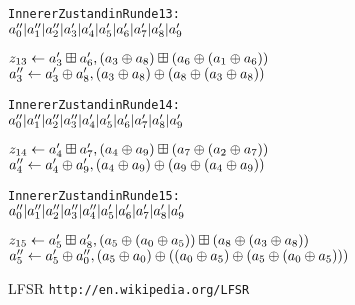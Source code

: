 \documentclass[a4paper,12pt]{article}
\begin{document}
\begin{appendix}
\begin{alltt}
Innerer Zustand in Runde 13:
\( a''\sb{0} | a''\sb{1} | a''\sb{2} | a'\sb{3} | a'\sb{4} | a'\sb{5} | a'\sb{6} | a'\sb{7} | a'\sb{8} | a'\sb{9} \)

\( z\sb{13} \leftarrow a'\sb{3} \boxplus a'\sb{6} , (a\sb{3} \oplus a\sb{8}) \boxplus (a\sb{6} \oplus (a\sb{1} \oplus a\sb{6})) \)
\( a''\sb{3} \leftarrow a'\sb{3} \oplus a'\sb{8} , (a\sb{3} \oplus a\sb{8}) \oplus (a\sb{8} \oplus (a\sb{3} \oplus a\sb{8})) \) 

Innerer Zustand in Runde 14:
\( a''\sb{0} | a''\sb{1} | a''\sb{2} | a''\sb{3} | a'\sb{4} | a'\sb{5} | a'\sb{6} | a'\sb{7} | a'\sb{8} | a'\sb{9} \)

\( z\sb{14} \leftarrow a'\sb{4} \boxplus a'\sb{7} , (a\sb{4} \oplus a\sb{9}) \boxplus (a\sb{7} \oplus (a\sb{2} \oplus a\sb{7})) \)
\( a''\sb{4} \leftarrow a'\sb{4} \oplus a'\sb{9} , (a\sb{4} \oplus a\sb{9}) \oplus (a\sb{9} \oplus (a\sb{4} \oplus a\sb{9})) \) 

Innerer Zustand in Runde 15:
\( a''\sb{0} | a''\sb{1} | a''\sb{2} | a''\sb{3} | a''\sb{4} | a'\sb{5} | a'\sb{6} | a'\sb{7} | a'\sb{8} | a'\sb{9} \)

\( z\sb{15} \leftarrow a'\sb{5} \boxplus a'\sb{8} , (a\sb{5} \oplus (a\sb{0} \oplus a\sb{5})) \boxplus (a\sb{8} \oplus (a\sb{3} \oplus a\sb{8})) \)
\( a''\sb{5} \leftarrow a'\sb{5} \oplus a''\sb{0} , (a\sb{5} \oplus a\sb{0}) \oplus ((a\sb{0} \oplus a\sb{5}) \oplus (a\sb{5} \oplus (a\sb{0} \oplus a\sb{5}))) \) 
\end{alltt}

\end{appendix}

\newpage


\nocite{*}
\begin{thebibliography}{15}
LFSR \nolinkurl{http://en.wikipedia.org/LFSR}

\end{thebibliography}
\end{document}
